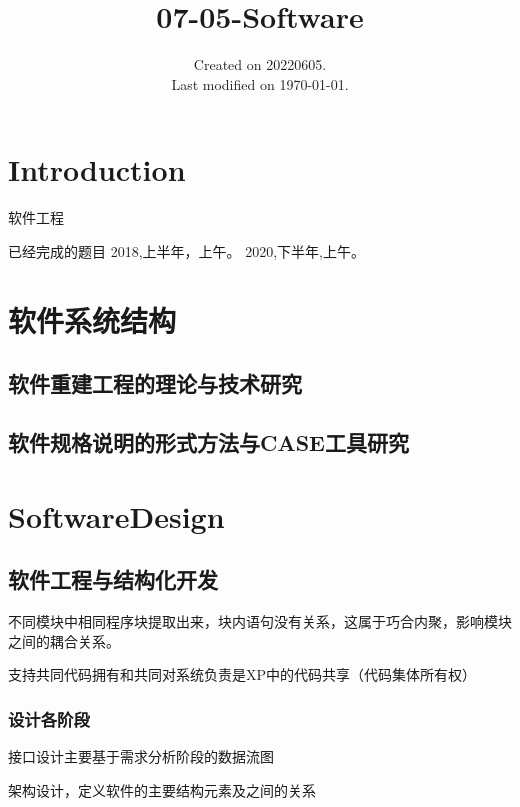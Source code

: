 \documentclass[UTF8]{../computerUniverse}
\begin{document}
\title{07-05-Software}
\date{Created on 20220605.\\   Last modified on \today.}
\maketitle
\tableofcontents


\chapter{Introduction}

软件工程


已经完成的题目
2018,上半年，上午。
2020,下半年,上午。





\chapter{软件系统结构}

\section{软件重建工程的理论与技术研究}
\section{软件规格说明的形式方法与CASE工具研究}


\chapter{SoftwareDesign}



\section{软件工程与结构化开发}

不同模块中相同程序块提取出来，块内语句没有关系，这属于巧合内聚，影响模块之间的耦合关系。


支持共同代码拥有和共同对系统负责是XP中的代码共享（代码集体所有权）


\subsection{设计各阶段}


接口设计主要基于需求分析阶段的数据流图

架构设计，定义软件的主要结构元素及之间的关系
\end{document}
